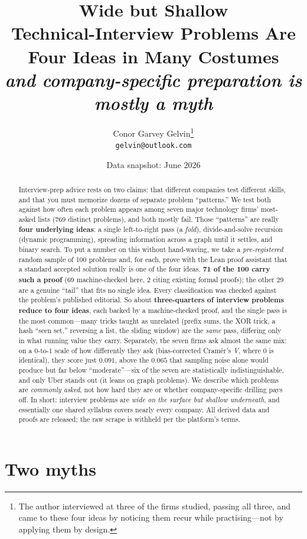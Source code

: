 \documentclass[11pt]{article}
\title{\textbf{Wide but Shallow}\\[2pt]
\large Technical-Interview Problems Are Four Ideas in Many Costumes\\[4pt]
\normalsize\itshape and company-specific preparation is mostly a myth}
\author{Conor Garvey Gelvin\thanks{The author interviewed at three of the firms studied,
passing all three, and came to these four ideas by noticing them recur while practising---not by
applying them by design.}\\
\texttt{gelvin@outlook.com}}
\date{Data snapshot: June 2026}
\newcommand{\V}{\textit{V}}
\begin{document}
\maketitle

\begin{abstract}
Interview-prep advice rests on two claims: that different companies test different skills, and that you must
memorize dozens of separate problem ``patterns.'' We test both against how often each problem appears among
seven major technology firms' most-asked lists (769 distinct problems), and both mostly fail.
Those ``patterns'' are really \textbf{four underlying ideas}: a single left-to-right
pass (a \emph{fold}), divide-and-solve recursion (dynamic programming), spreading information across a graph
until it settles, and binary search. To put a number on this without hand-waving, we take a
\emph{pre-registered} random sample of 100 problems and, for each, prove with the Lean proof assistant that a
standard accepted solution really is one of the four ideas. \textbf{71 of the 100 carry such a proof} (69
machine-checked here, 2 citing existing formal proofs); the other 29 are a genuine ``tail'' that fits no
single idea. Every classification was checked against the problem's published editorial. So about
\textbf{three-quarters of interview problems reduce to four ideas}, each backed by a
machine-checked proof, and the single pass is the most
common---many tricks taught as unrelated (prefix sums, the XOR trick, a hash ``seen set,'' reversing a list,
the sliding window) are the \emph{same} pass, differing only in what running value they carry. Separately,
the seven firms ask almost the same mix: on a $0$-to-$1$ scale of how differently
they ask (bias-corrected Cram\'er's \V, where $0$ is identical), they score just $0.091$,
above the $0.065$ that sampling noise alone would
produce but far below ``moderate''---six of the seven are statistically indistinguishable, and only Uber
stands out (it leans on graph problems). We describe which problems are \emph{commonly asked}, not how hard
they are or whether company-specific drilling pays off. In short: interview problems are \emph{wide on the
surface but shallow underneath}, and essentially one shared syllabus covers nearly every company. All derived
data and proofs are released; the raw scrape is withheld per the platform's terms.
\end{abstract}

\section{Two myths}
\label{sec:intro}
\end{document}
